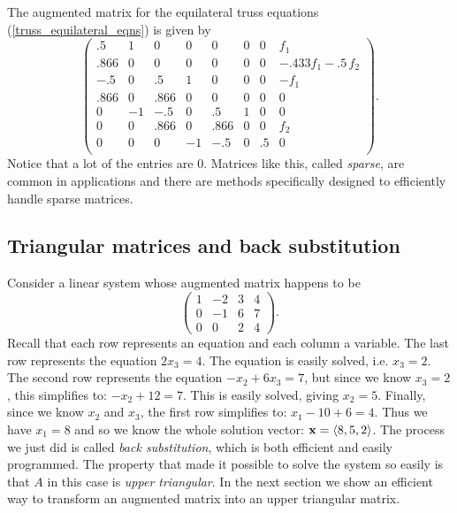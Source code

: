 The augmented matrix for the equilateral truss equations
(\ref{truss_equilateral_eqns}) is given by
\begin{equation}\label{truss_equilateral_matrix}
\left(\begin{array}{ccccccc|c}
        .5    & 1 & 0 & 0 & 0 & 0 & 0 & f_1 \\
        .866  & 0 & 0  & 0 & 0 & 0 &  0 & -.433  f_1 - .5 \, f_2  \\
         -.5  & 0 & .5 &  1 & 0 & 0 & 0  & - f_1 \\
        .866  & 0 & .866  & 0 & 0 & 0 & 0 & 0 \\
         0    & -1 & - .5  & 0 & .5 & 1 &  0 & 0 \\
         0    & 0  & .866  & 0 & .866 & 0 & 0 &  f_2 \\
         0 &  0 &  0  & -1  & - .5  &0 & .5 & 0 \\
      \end{array}\right).
\end{equation}
Notice that a lot of the entries are $0$. Matrices like this, called
{\em sparse}, are common in applications and there are methods
specifically designed to efficiently handle sparse matrices.



\subsection*{Triangular matrices and back substitution}

Consider a linear system whose augmented matrix happens to be
\begin{equation}\label{upper}
\left(\begin{array}{ccc|c}
        1 & -2 & 3 & 4 \\
        0 & -1 & 6 & 7 \\
        0 & 0 & 2 & 4
      \end{array}\right).
\end{equation}
Recall that each row represents an equation and each column a variable.
The last row represents the equation $2 x_3 = 4$. The equation is
easily solved, i.e. $x_3 = 2$. The second row represents the equation
$- x_2 + 6 x_3 = 7$, but since we know $x_3 = 2$, this simplifies to:
$ - x_2 + 12 = 7$. This is easily solved, giving $x_2 = 5$. Finally,
since we know $x_2$ and $x_3$, the first row simplifies to:
$x_1 - 10 + 6 = 4$. Thus we have $x_1 = 8$ and so we know the
whole solution vector: $\mathbf{x} = \langle 8 , 5, 2 \rangle$. The process
we just did is called {\em back substitution}, which is both efficient
and easily programmed. The property that made it possible
to solve the system so easily is that $A$ in this case is {\em upper
triangular}. In the next section we show an efficient way to
transform an augmented matrix into an upper triangular matrix.


